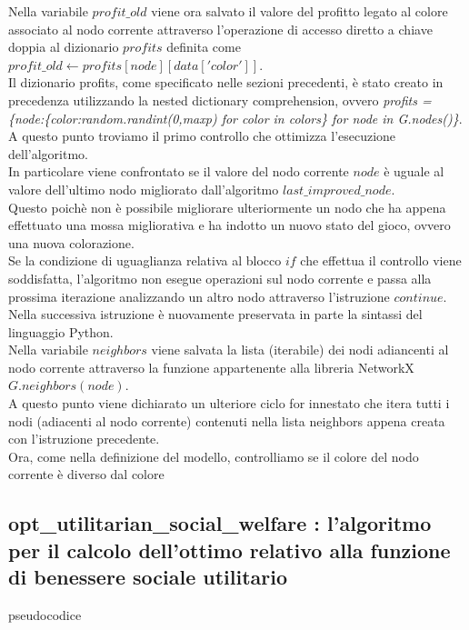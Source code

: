 Nella variabile $profit\_old$ viene ora salvato il valore del profitto legato al colore associato al nodo corrente attraverso l'operazione di accesso diretto a chiave doppia al dizionario $profits$ definita come $profit\_old\gets profits[node][data['color']]$.\\
Il dizionario profits, come specificato nelle sezioni precedenti, è stato creato in precedenza utilizzando la nested dictionary comprehension, ovvero \textit{profits = \{node:\{color:random.randint(0,maxp) for color in colors\} for node in G.nodes()\}}.\\

A questo punto troviamo il primo controllo che ottimizza l'esecuzione dell'algoritmo.\\
In particolare viene confrontato se il valore del nodo corrente $node$ è uguale al valore dell'ultimo nodo migliorato dall'algoritmo $last\_improved\_node$.\\
Questo poichè non è possibile migliorare ulteriormente un nodo che ha appena effettuato una mossa migliorativa e ha indotto un nuovo stato del gioco, ovvero una nuova colorazione.\\
Se la condizione di uguaglianza relativa al blocco $if$ che effettua il controllo viene soddisfatta, l'algoritmo non esegue operazioni sul nodo corrente e passa alla prossima iterazione analizzando un altro nodo attraverso l'istruzione $continue$.\\

Nella successiva istruzione è nuovamente preservata in parte la sintassi del linguaggio Python.\\
Nella variabile $neighbors$ viene salvata la lista (iterabile) dei nodi adiancenti al nodo corrente attraverso la funzione appartenente alla libreria NetworkX $G.neighbors(node)$.\\

A questo punto viene dichiarato un ulteriore ciclo for innestato che itera tutti i nodi (adiacenti al nodo corrente) contenuti nella lista neighbors appena creata con l'istruzione precedente.\\

Ora, come nella definizione del modello, controlliamo se il colore del nodo corrente è diverso dal colore 

\newpage
\subsection{opt\_utilitarian\_social\_welfare : l'algoritmo per il calcolo dell'ottimo relativo alla funzione di benessere sociale utilitario}
\justify
pseudocodice \\

